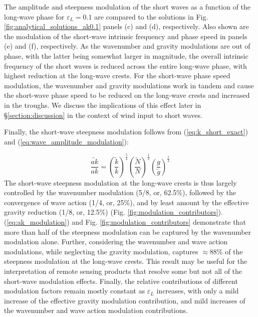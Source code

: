\documentclass[lineno]{jfm}
\begin{document}
The amplitude and steepness modulation of the short waves as a function of the
long-wave phase for $\varepsilon_L = 0.1$ are compared to the
\citet{longuet1960changes} solutions in Fig.
\ref{fig:analytical_solutions_ak0.1} panels (c) and (d), respectively.
Also shown are the modulation of the short-wave intrinsic frequency and phase
speed in panels (e) and (f), respectively.
As the wavenumber and gravity modulations are out of phase, with the latter
being somewhat larger in magnitude, the overall intrinsic frequency of the
short waves is reduced across the entire long-wave phase, with highest reduction
at the long-wave crests.
For the short-wave phase speed modulation, the wavenumber and gravity modulations
work in tandem and cause the short-wave phase speed to be reduced on the long-wave
crests and increased in the troughs.
We discuss the implications of this effect later in \S\ref{section:discussion}
in the context of wind input to short waves.

Finally, the short-wave steepness modulation follows from (\ref{eq:k_short_exact})
and (\ref{eq:wave_amplitude_modulation}):

\begin{equation}
\label{eq:ak_modulation}
\dfrac{\widetilde{ak}}{ak} = 
  \left( \dfrac{\widetilde{k}}{k} \right)^{\frac{5}{4}}
  \left( \dfrac{\widetilde{N}}{N} \right)^{\frac{1}{2}}
  \left( \dfrac{g}{\widetilde{g}} \right)^{\frac{1}{4}}
\end{equation}
The short-wave steepness modulation at the long-wave crests is thus largely
controlled by the wavenumber modulation (5/8, or, 62.5\%), followed by the
convergence of wave action (1/4, or, 25\%), and by least amount by the
effective gravity reduction (1/8, or, 12.5\%) (Fig. \ref{fig:modulation_contributors}).
(\ref{eq:ak_modulation}) and Fig. \ref{fig:modulation_contributors} demonstrate
that more than half of the steepness modulation can be captured by the
wavenumber modulation alone.
Further, considering the wavenumber and wave action modulations, while
neglecting the gravity modulation, captures $\approx$88\% of the steepness
modulation at the long-wave crests.
This result may be useful for the interpretation of remote sensing products
that resolve some but not all of the short-wave modulation effects.
Finally, the relative contributions of different modulation factors remain
mostly constant as $\varepsilon_L$ increases, with only a mild increase of the
effective gravity modulation contribution, and mild increases of the
wavenumber and wave action modulation contributions.
\end{document}
